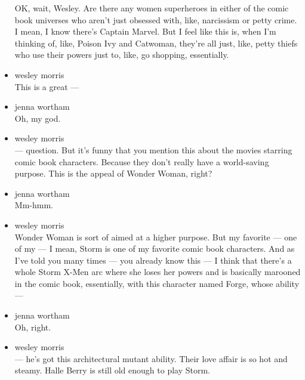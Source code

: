 \begin{itemize}
  OK, wait, Wesley. Are there any women superheroes in either of the
  comic book universes who aren't just obsessed with, like, narcissism
  or petty crime. I mean, I know there's Captain Marvel. But I feel like
  this is, when I'm thinking of, like, Poison Ivy and Catwoman, they're
  all just, like, petty thiefs who use their powers just to, like, go
  shopping, essentially.
\item
  wesley morris\\
  This is a great ---
\item
  jenna wortham\\
  Oh, my god.
\item
  wesley morris\\
  --- question. But it's funny that you mention this about the movies
  starring comic book characters. Because they don't really have a
  world-saving purpose. This is the appeal of Wonder Woman, right?
\item
  jenna wortham\\
  Mm-hmm.
\item
  wesley morris\\
  Wonder Woman is sort of aimed at a higher purpose. But my favorite ---
  one of my --- I mean, Storm is one of my favorite comic book
  characters. And as I've told you many times --- you already know this
  --- I think that there's a whole Storm X-Men arc where she loses her
  powers and is basically marooned in the comic book, essentially, with
  this character named Forge, whose ability ---
\item
  jenna wortham\\
  Oh, right.
\item
  wesley morris\\
  --- he's got this architectural mutant ability. Their love affair is
  so hot and steamy. Halle Berry is still old enough to play Storm.


\end{itemize}
